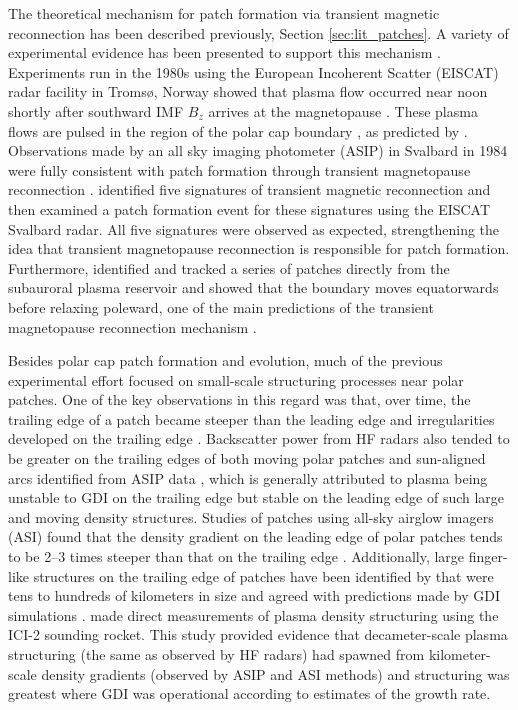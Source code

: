 The theoretical mechanism for patch formation via transient magnetic reconnection has been described previously, Section \ref{sec:lit_patches}.  A variety of experimental evidence has been presented to support this mechanism \citep{Cowley1998,Carlson2002}.  Experiments run in the 1980s using the European Incoherent Scatter (EISCAT) radar facility in Troms\o, Norway showed that plasma flow occurred near noon shortly after southward IMF \(B_z\) arrives at the magnetopause \citep{Etemadi1988,Todd1988}.  These plasma flows are pulsed in the region of the polar cap boundary \citep{Lockwood1993a,Lockwood1993b}, as predicted by \citet{Cowley1991}.  Observations made by an all sky imaging photometer (ASIP) in Svalbard in 1984 were fully consistent with patch formation through transient magnetopause reconnection \citep{Carlson1996,Carlson2002}.  \citet{Carlson2004} identified five signatures of transient magnetic reconnection and then examined a patch formation event for these signatures using the EISCAT Svalbard radar.  All five signatures were observed as expected, strengthening the idea that transient magnetopause reconnection is responsible for patch formation.  Furthermore, \citet{Carlson2006} identified and tracked a series of patches directly from the subauroral plasma reservoir and showed that the boundary moves equatorwards before relaxing poleward, one of the main predictions of the transient magnetopause reconnection mechanism \citep{Lockwood1992b}.

Besides polar cap patch formation and evolution, much of the previous experimental effort focused on small-scale structuring processes near polar patches.  One of the key observations in this regard was that, over time, the trailing edge of a patch became steeper than the leading edge and irregularities developed on the trailing edge \citep{Weber1984}.  Backscatter power from HF radars also tended to be greater on the trailing edges of both moving polar patches \citep{Milan2002b} and sun-aligned arcs identified from ASIP data \citep{Koustov2012}, which is generally attributed to plasma being unstable to GDI on the trailing edge but stable on the leading edge of such large and moving density structures.  Studies of patches using all-sky airglow imagers (ASI) found that the density gradient on the leading edge of polar patches tends to be 2--3 times steeper than that on the trailing edge \citep{Hosokawa2016}.  Additionally, large finger-like structures on the trailing edge of patches have been identified by \citet{Hosokawa2016} that were tens to hundreds of kilometers in size and agreed with predictions made by GDI simulations \citep{Gondarenko2004b}.  \citet{Moen2012} made direct measurements of plasma density structuring using the ICI-2 sounding rocket.  This study provided evidence that decameter-scale plasma structuring (the same as observed by HF radars) had spawned from kilometer-scale density gradients (observed by ASIP and ASI methods) and structuring was greatest where GDI was operational according to estimates of the growth rate.

